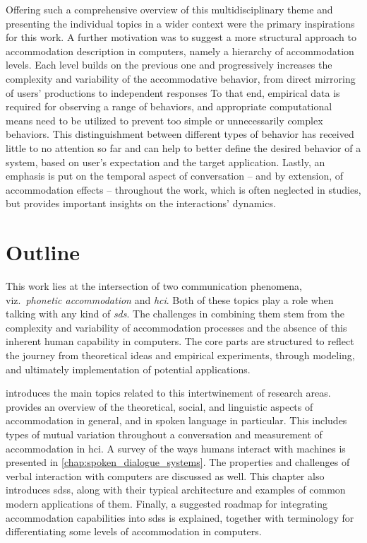 Offering such a comprehensive overview of this multidisciplinary theme and presenting the individual topics in a wider context were the primary inspirations for this work.
A further motivation was to suggest a more structural approach to accommodation description in computers, namely a hierarchy of accommodation levels.
Each level builds on the previous one and progressively increases the complexity and variability of the accommodative behavior, from direct mirroring of users' productions to independent responses
To that end, empirical data is required for observing a range of behaviors, and appropriate computational means need to be utilized to prevent too simple or unnecessarily complex behaviors.
This distinguishment between different types of behavior has received little to no attention so far and can help to better define the desired behavior of a system, based on user's expectation and the target application.
Lastly, an emphasis is put on the temporal aspect of conversation -- and by extension, of accommodation effects -- throughout the work, which is often neglected in studies, but provides important insights on the interactions' dynamics.

\section{Outline}
\label{outline} %

This work lies at the intersection of two communication phenomena, viz.\ \emph{phonetic accommodation} and \emph{\acl{hci}}.
Both of these topics play a role when talking with any kind of \emph{\acl{sds}}.
The challenges in combining them stem from the complexity and variability of accommodation processes and the absence of this inherent human capability in computers.
The core parts are structured to reflect the journey from theoretical ideas and empirical experiments, through modeling, and ultimately implementation of potential applications.

 introduces the main topics related to this intertwinement of research areas.
 provides an overview of the theoretical, social, and linguistic aspects of accommodation in general, and in spoken language in particular.
This includes types of mutual variation throughout a conversation and measurement of accommodation in \acl{hci}.
A survey of the ways humans interact with machines is presented in \cref{chap:spoken_dialogue_systems}.
The properties and challenges of verbal interaction with computers are discussed as well.
This chapter also introduces \aclp{sds}, along with their typical architecture and examples of common modern applications of them.
Finally, a suggested roadmap for integrating accommodation capabilities into \aclp{sds} is explained, together with terminology for differentiating some levels of accommodation in computers.

